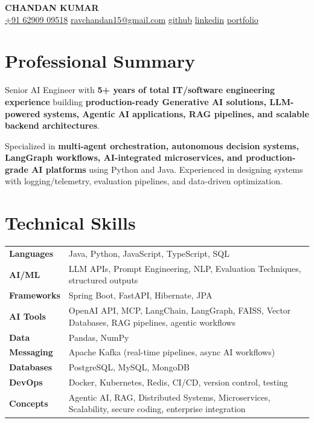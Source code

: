 \documentclass[10pt, letterpaper]{article}
\begin{document}
\begin{center}
{\LARGE\bfseries\color{primary} CHANDAN KUMAR}\\[4pt]

\small\color{subtle}
\href{tel:+916290909518}{+91 62909 09518} \quad
\href{mailto:ravchandan15@gmail.com}{ravchandan15@gmail.com} \quad
\href{https://github.com/RavSinghChandan}{github} \quad
\href{https://linkedin.com}{linkedin} \quad
\href{https://chandan-kumar-ai-engineer.vercel.app/}{portfolio}
\end{center}

\vspace{-2pt}

\section{Professional Summary}

\noindent Senior AI Engineer with \textbf{5+ years of total IT/software engineering experience} building \textbf{production-ready Generative AI solutions, LLM-powered systems, Agentic AI applications, RAG pipelines, and scalable backend architectures}.

\vspace{3pt}

\noindent Specialized in \textbf{multi-agent orchestration, autonomous decision systems, LangGraph workflows, AI-integrated microservices, and production-grade AI platforms} using Python and Java. Experienced in designing systems with logging/telemetry, evaluation pipelines, and data-driven optimization.

\section{Technical Skills}

\begin{tabularx}{\textwidth}{@{} l X @{}}
\textbf{Languages} & Java, Python, JavaScript, TypeScript, SQL \\[2pt]
\textbf{AI/ML} & LLM APIs, Prompt Engineering, NLP, Evaluation Techniques, structured outputs \\[2pt]
\textbf{Frameworks} & Spring Boot, FastAPI, Hibernate, JPA \\[2pt]
\textbf{AI Tools} & OpenAI API, MCP, LangChain, LangGraph, FAISS, Vector Databases, RAG pipelines, agentic workflows \\[2pt]
\textbf{Data} & Pandas, NumPy \\[2pt]
\textbf{Messaging} & Apache Kafka (real-time pipelines, async AI workflows) \\[2pt]
\textbf{Databases} & PostgreSQL, MySQL, MongoDB \\[2pt]
\textbf{DevOps} & Docker, Kubernetes, Redis, CI/CD, version control, testing \\[2pt]
\textbf{Concepts} & Agentic AI, RAG, Distributed Systems, Microservices, Scalability, secure coding, enterprise integration \\
\end{tabularx}
\end{document}
